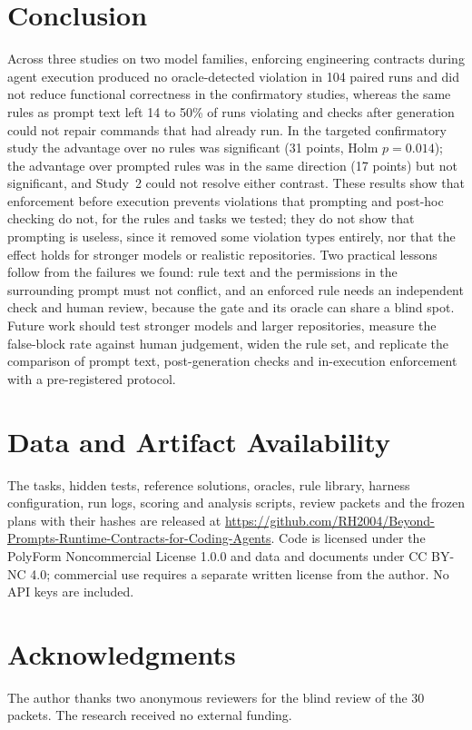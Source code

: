 \documentclass[conference]{IEEEtran}
\begin{document}
\section{Conclusion}
Across three studies on two model families, enforcing engineering contracts during agent execution produced no oracle-detected violation in 104 paired runs and did not reduce functional correctness in the confirmatory studies, whereas the same rules as prompt text left 14 to 50\% of runs violating and checks after generation could not repair commands that had already run.
In the targeted confirmatory study the advantage over no rules was significant (31 points, Holm $p=0.014$); the advantage over prompted rules was in the same direction (17 points) but not significant, and Study~2 could not resolve either contrast.
These results show that enforcement before execution prevents violations that prompting and post-hoc checking do not, for the rules and tasks we tested; they do not show that prompting is useless, since it removed some violation types entirely, nor that the effect holds for stronger models or realistic repositories.
Two practical lessons follow from the failures we found: rule text and the permissions in the surrounding prompt must not conflict, and an enforced rule needs an independent check and human review, because the gate and its oracle can share a blind spot.
Future work should test stronger models and larger repositories, measure the false-block rate against human judgement, widen the rule set, and replicate the comparison of prompt text, post-generation checks and in-execution enforcement with a pre-registered protocol.

\section*{Data and Artifact Availability}
The tasks, hidden tests, reference solutions, oracles, rule library, harness configuration, run logs, scoring and analysis scripts, review packets and the frozen plans with their hashes are released at \url{https://github.com/RH2004/Beyond-Prompts-Runtime-Contracts-for-Coding-Agents}. Code is licensed under the PolyForm Noncommercial License 1.0.0 and data and documents under CC BY-NC 4.0; commercial use requires a separate written license from the author. No API keys are included.

\section*{Acknowledgments}
The author thanks two anonymous reviewers for the blind review of the 30 packets. The research received no external funding.
\end{document}
